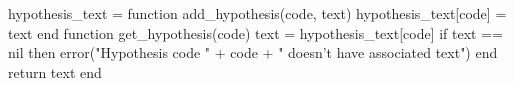 \usepackage{turnipcite}



\RequirePackage{amsthm}
\theoremstyle{definition}
\newtheorem{definition}{Definition}[chapter]
\newtheorem{example}{Example}[chapter]




\RequirePackage[small,bf]{caption}
\captionsetup{format=hang,justification=centering}


\RequirePackage{subcaption}
\RequirePackage{adjustbox}




\usepackage[capitalize,nameinlink]{cleveref}
\usepackage{crossreftools}

\let\ORGhypersetup\hypersetup
\protected\def\hypersetup{\ORGhypersetup}


\setcounter{hypI}{0}
\renewcommand{\thehypI}{H-\arabic{hypI}}
\newcommand{\newhyp}{%
    \refstepcounter{hypI}%
    \thehypI%
}

\begin{luacode*}
hypothesis_text = {}
function add_hypothesis(code, text)
    hypothesis_text[code] = text
end
function get_hypothesis(code)
    text = hypothesis_text[code]
    if text == nil then
        error("Hypothesis code " + code + " doesn't have associated text")
    end
    return text
end
\end{luacode*}
\newcommand{\sethyptext}[2]{\luadirect{add_hypothesis(\luastring{#1}, \luastring{#2})}}
\newcommand{\gethyptext}[1]{\luadirect{tex.sprint(get_hypothesis(\luastring{#1}))}}

